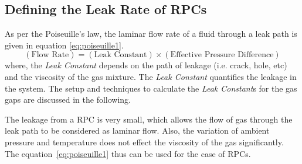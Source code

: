 \subsection{Defining the Leak Rate of RPCs}
As per the Poiseuille's law\cite{poiseuille}, the laminar flow rate of a fluid through a leak path is given in equation \ref{eq:poiseuille1}.
\begin{equation}
\left(\text{Flow Rate}\right)=\left(\text{Leak Constant}\right)\times\left(\text{Effective Pressure Difference}\right)\label{eq:poiseuille1}
\end{equation}
where, the \textit{Leak Constant} depends on the path of leakage (i.e. crack, hole, etc) and the viscosity of the gas mixture. The \textit{Leak Constant} quantifies the leakage in the system. The setup and techniques to calculate the \textit{Leak Constant}s for the gas gaps are discussed in the following.

The leakage from a RPC is very small, which allows the flow of gas through the leak path to be considered as laminar flow. Also, the variation of ambient pressure and temperature does not effect the viscosity of the gas significantly. The equation~\ref{eq:poiseuille1} thus can be used for the case of RPCs.

